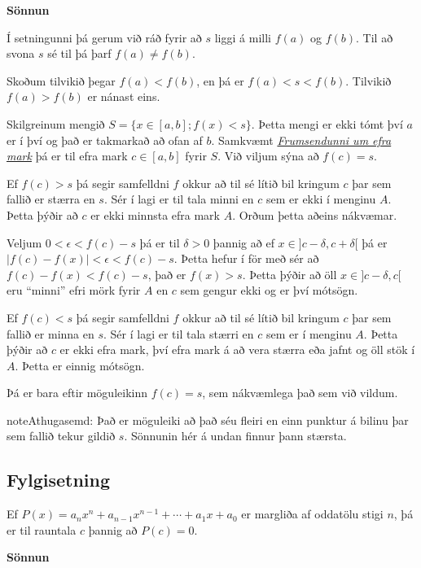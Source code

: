 \documentclass[b5paper,10pt,icelandic]{sphinxmanual}
\begin{document}
\textbf{Sönnun}

Í setningunni þá gerum við ráð fyrir að \(s\) liggi á milli \(f(a)\) og
\(f(b)\). Til að svona \(s\) sé til þá þarf \(f(a) \neq f(b)\).

Skoðum tilvikið þegar \(f(a) < f(b)\), en þá er \(f(a) < s < f(b)\).
Tilvikið \(f(a)>f(b)\) er nánast eins.

Skilgreinum mengið \(S = \{ x \in [a,b] ; f(x) < s\}\). Þetta mengi er ekki tómt
því \(a\) er í því og það er takmarkað að ofan af \(b\). Samkvæmt
{\hyperref[kafli01:frumsendanumeframark]{\emph{Frumsendunni um efra mark}}} þá er til efra mark \(c \in[a,b]\)
fyrir \(S\). Við viljum sýna að \(f(c)=s\).

Ef \(f(c)>s\) þá segir samfelldni \(f\)
okkur að til sé lítið bil kringum \(c\) þar sem fallið er stærra en \(s\). Sér í lagi er
til tala minni en \(c\) sem er ekki í menginu \(A\). Þetta þýðir að \(c\) er
ekki minnsta efra mark \(A\). Orðum þetta aðeins nákvæmar.

Veljum \(0<\epsilon < f(c)-s\) þá er til \(\delta>0\) þannig að ef \(x\in ]c-\delta,c+\delta[\)
þá er \(|f(c)-f(x)|<\epsilon < f(c) -s\). Þetta hefur í för með sér að \(f(c) - f(x) < f(c) -s\),
það er \(f(x)>s\). Þetta þýðir að öll \(x\in]c-\delta,c[\) eru ``minni'' efri mörk fyrir \(A\)
en \(c\) sem gengur ekki og er því mótsögn.

Ef \(f(c)<s\) þá segir samfelldni \(f\) okkur að til sé lítið bil kringum \(c\)
þar sem fallið er minna en \(s\). Sér í lagi  er til tala stærri en \(c\) sem er í menginu
\(A\). Þetta þýðir að \(c\) er ekki efra mark, því efra mark á að vera stærra eða jafnt
og öll stök í \(A\). Þetta er einnig mótsögn.

Þá er bara eftir möguleikinn \(f(c)=s\), sem nákvæmlega það sem við vildum.

\begin{notice}{note}{Athugasemd:}
Það er möguleiki að það séu fleiri en einn punktur á bilinu þar sem fallið tekur
gildið \(s\). Sönnunin hér á undan finnur þann stærsta.
\end{notice}


\subsection{Fylgisetning}
\label{kafli02:fylgisetning}
Ef \(P(x)=a_nx^n+a_{n-1}x^{n-1}+\cdots+a_1x+a_0\) er margliða af
oddatölu stigi \(n\), þá er til rauntala \(c\) þannig að \(P(c)=0\).

\textbf{Sönnun}
\end{document}
